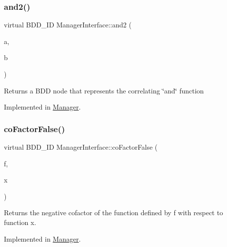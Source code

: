 \subsubsection{\texorpdfstring{and2()}{and2()}}
{\footnotesize\ttfamily virtual B\+D\+D\+\_\+\+ID Manager\+Interface\+::and2 (\begin{DoxyParamCaption}\item[{const B\+D\+D\+\_\+\+ID}]{a,  }\item[{const B\+D\+D\+\_\+\+ID}]{b }\end{DoxyParamCaption})\hspace{0.3cm}{\ttfamily [pure virtual]}}

\begin{DoxyReturn}{Returns}
a B\+DD node that represents the correlating \char`\"{}and\char`\"{} function 
\end{DoxyReturn}


Implemented in \hyperlink{classManager_a029fff4ef6650e4fd1f0ff37a69252de}{Manager}.

\mbox{\label{classManagerInterface_af5ea9287d7b926763f4972457ba067c7}} 
\subsubsection{\texorpdfstring{co\+Factor\+False()}{coFactorFalse()}\hspace{0.1cm}{\footnotesize\ttfamily [1/2]}}
{\footnotesize\ttfamily virtual B\+D\+D\+\_\+\+ID Manager\+Interface\+::co\+Factor\+False (\begin{DoxyParamCaption}\item[{const B\+D\+D\+\_\+\+ID}]{f,  }\item[{B\+D\+D\+\_\+\+ID}]{x }\end{DoxyParamCaption})\hspace{0.3cm}{\ttfamily [pure virtual]}}

\begin{DoxyReturn}{Returns}
the negative cofactor of the function defined by f with respect to function x. 
\end{DoxyReturn}


Implemented in \hyperlink{classManager_aea635ff0e0ec0cc8b43799f2d18de598}{Manager}.

\mbox{\label{classManagerInterface_a8e4b1e439b4ce7d510d19ec1f45b03cf}} 
